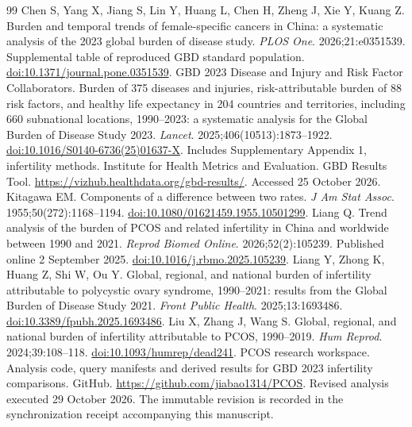 \documentclass[11pt,a4paper]{article}
\begin{document}
{\small{}
\begin{thebibliography}{99}
Chen S, Yang X, Jiang S, Lin Y, Huang L, Chen H, Zheng J, Xie Y, Kuang Z. Burden and temporal trends of female-specific cancers in China: a systematic analysis of the 2023 global burden of disease study. \emph{PLOS One}. 2026;21:e0351539. Supplemental table of reproduced GBD standard population. \href{https://doi.org/10.1371/journal.pone.0351539}{doi:10.1371/journal.pone.0351539}.
GBD 2023 Disease and Injury and Risk Factor Collaborators. Burden of 375 diseases and injuries, risk-attributable burden of 88 risk factors, and healthy life expectancy in 204 countries and territories, including 660 subnational locations, 1990--2023: a systematic analysis for the Global Burden of Disease Study 2023. \emph{Lancet}. 2025;406(10513):1873--1922. \href{https://doi.org/10.1016/S0140-6736(25)01637-X}{doi:10.1016/S0140-6736(25)01637-X}. Includes Supplementary Appendix 1, infertility methods.
Institute for Health Metrics and Evaluation. GBD Results Tool. \url{https://vizhub.healthdata.org/gbd-results/}. Accessed 25 October 2026.
Kitagawa EM. Components of a difference between two rates. \emph{J Am Stat Assoc}. 1955;50(272):1168--1194. \href{https://doi.org/10.1080/01621459.1955.10501299}{doi:10.1080/01621459.1955.10501299}.
Liang Q. Trend analysis of the burden of PCOS and related infertility in China and worldwide between 1990 and 2021. \emph{Reprod Biomed Online}. 2026;52(2):105239. Published online 2 September 2025. \href{https://doi.org/10.1016/j.rbmo.2025.105239}{doi:10.1016/j.rbmo.2025.105239}.
Liang Y, Zhong K, Huang Z, Shi W, Ou Y. Global, regional, and national burden of infertility attributable to polycystic ovary syndrome, 1990--2021: results from the Global Burden of Disease Study 2021. \emph{Front Public Health}. 2025;13:1693486. \href{https://doi.org/10.3389/fpubh.2025.1693486}{doi:10.3389/fpubh.2025.1693486}.
Liu X, Zhang J, Wang S. Global, regional, and national burden of infertility attributable to PCOS, 1990--2019. \emph{Hum Reprod}. 2024;39:108--118. \href{https://doi.org/10.1093/humrep/dead241}{doi:10.1093/humrep/dead241}.
PCOS research workspace. Analysis code, query manifests and derived results for GBD 2023 infertility comparisons. GitHub. \url{https://github.com/jiabao1314/PCOS}. Revised analysis executed 29 October 2026. The immutable revision is recorded in the synchronization receipt accompanying this manuscript.

\end{thebibliography}}
\end{document}
